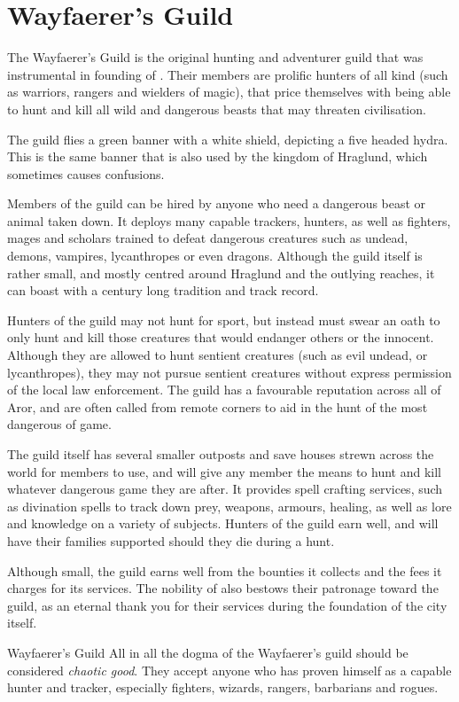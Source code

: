 \section{Wayfaerer's Guild}
\label{sec:Wayfaerers Guild}

The Wayfaerer's Guild is the original hunting and adventurer guild that was
instrumental in founding of . Their members are prolific
hunters of all kind (such as warriors, rangers and wielders of magic), that
price themselves with being able to hunt and kill all wild and dangerous
beasts that may threaten civilisation.

The guild flies a green banner with a white shield, depicting a five headed
hydra. This is the same banner that is also used by the kingdom of Hraglund,
which sometimes causes confusions.

Members of the guild can be hired by anyone who need a dangerous beast or animal
taken down. It deploys many capable trackers, hunters, as well as fighters,
mages and scholars trained to defeat dangerous creatures such as undead, demons,
vampires, lycanthropes or even dragons. Although the guild itself is rather
small, and mostly centred around Hraglund and the outlying reaches, it can boast
with a century long tradition and track record.

Hunters of the guild may not hunt for sport, but instead must swear an oath to
only hunt and kill those creatures that would endanger others or the innocent.
Although they are allowed to hunt sentient creatures (such as evil undead, or
lycanthropes), they may not pursue sentient creatures without express permission
of the local law enforcement. The guild has a favourable reputation across all
of Aror, and are often called from remote corners to aid in the hunt of the
most dangerous of game.

The guild itself has several smaller outposts and save houses strewn across the
world for members to use, and will give any member the means to hunt and kill
whatever dangerous game they are after. It provides spell crafting services,
such as divination spells to track down prey, weapons, armours, healing, as well
as lore and knowledge on a variety of subjects. Hunters of the guild earn well,
and will have their families supported should they die during a hunt.

Although small, the guild earns well from the bounties it collects and the fees
it charges for its services. The nobility of  also bestows
their patronage toward the guild, as an eternal thank you for their services
during the foundation of the city itself.

\begin{35e}{Wayfaerer's Guild}
  All in all the dogma of the Wayfaerer's guild should be considered
  \emph{chaotic good}. They accept anyone who has proven himself as a capable
  hunter and tracker, especially fighters, wizards, rangers, barbarians and
  rogues.
\end{35e}
